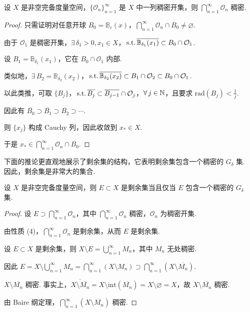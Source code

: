 \begin{theorem}
    设 $X$ 是非空完备度量空间，$\{\mathcal{O}_n\}_{n=1}^\infty$ 是 $X$ 中一列稠密开集，则 $\bigcap_{n=1}^\infty \mathcal{O}_n$ 稠密.
\end{theorem}
\begin{proof}
    只需证明对任意开球 $B_0 = \mathbb{B}_{\varepsilon}(x)$，$\bigcap_{n=1}^\infty \mathcal{O}_n \cap B_0 \neq \varnothing$.\par
    由于 $\mathcal{O}_1$ 是稠密开集，$\exists\, \delta_1 > 0, x_1 \in X$，$\operatorname{\,\text{s.t.}} \overline{\mathbb{B}_{\delta_1}(x_1)} \subset B_0 \cap \mathcal{O}_1$.\par
    设 $B_1 = \mathbb{B}_{\delta_1}(x_1)$，它在 $B_0 \cap \mathcal{O}_1$ 内部.\par
    类似地，$\exists\, B_2 = \mathbb{B}_{\delta_2}(x_2)$，$\operatorname{\,\text{s.t.}} \overline{\mathbb{B}_{\delta_2}(x_2)} \subset B_1 \cap \mathcal{O}_2 \subset B_0 \cap \mathcal{O}_1$.\par
    以此类推，可取 $\{B_j\}$，$\operatorname{\,\text{s.t.}} \overline{B_j} \subset \overline{B_{j-1}} \cap \mathcal{O}_j$，$\forall\, j \in \mathbb{N}$，且要求 $\mathrm{rad}(B_j) < \frac{1}{j}$.\par
    因此有 $\overline{B_0} \supset \overline{B_1} \supset \overline{B_2} \supset \cdots$.\par
    则 $\{x_j\}$ 构成 Cauchy 列，因此收敛到 $x_* \in X$.\par
    于是 $x_* \in \bigcap_{n=1}^\infty \mathcal{O}_n \cap B_0$.
\end{proof}



下面的推论更直观地展示了剩余集的结构，它表明剩余集包含一个稠密的 $G_\delta$ 集.因此，剩余集是非常大的集合.
\begin{corollary}
    设 $X$ 是非空完备度量空间，则 $E \subset X$ 是剩余集当且仅当 $E$ 包含一个稠密的 $G_\delta$ 集.
\end{corollary}
\begin{proof}
    \fbox{$\Leftarrow$} 设 $E \supset \bigcap_{n=1}^\infty \mathcal{O}_n$，其中 $\bigcap_{n=1}^\infty \mathcal{O}_n$ 稠密，$\mathcal{O}_n$ 为稠密开集.\par
    由性质 (4)，$\bigcap_{n=1}^\infty \mathcal{O}_n$ 是剩余集，从而 $E$ 是剩余集.\par
    \fbox{$\Rightarrow$} 设 $E \subset X$ 是剩余集，则 $X \setminus E = \bigcup_{n=1}^\infty M_n$，其中 $M_n$ 无处稠密.\par
    因此 $E = X \setminus \bigcup_{n=1}^\infty M_n = \bigcap_{n=1}^\infty (X \setminus M_n) \supset \bigcap_{n=1}^\infty (X \setminus \overline{M_n})$.\par
    \begin{claim}{$X \setminus \overline{M_n}$ 稠密.}
    事实上，$\overline{X \setminus \overline{M_n}} = X \setminus \mathrm{int}(\overline{M_n}) = X \setminus \varnothing = X$，故 $X \setminus \overline{M_n}$ 稠密.
    \end{claim}\par
    由 Baire 纲定理，$\bigcap_{n=1}^\infty (X \setminus \overline{M_n})$ 稠密.
\end{proof}

